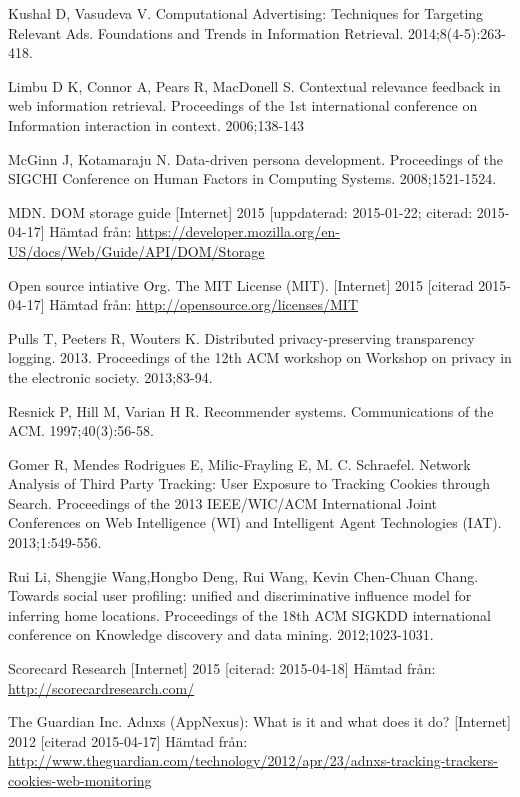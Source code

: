 \documentclass[a4paper,11pt]{article}
\begin{document}
{\begin{thebibliography}{888}
Kushal D, Vasudeva V. Computational Advertising: Techniques for Targeting Relevant Ads. Foundations and Trends in Information Retrieval. 2014;8(4-5):263-418.

Limbu D K, Connor A, Pears R, MacDonell S. Contextual relevance feedback in web information retrieval. Proceedings of the 1st international conference on Information interaction in context. 2006;138-143

McGinn J, Kotamaraju N. Data-driven persona development. Proceedings of the SIGCHI Conference on Human Factors in Computing Systems. 2008;1521-1524.

MDN. DOM storage guide [Internet] 2015 [uppdaterad: 2015-01-22; citerad: 2015-04-17] Hämtad från: \url{https://developer.mozilla.org/en-US/docs/Web/Guide/API/DOM/Storage}

Open source intiative Org. The MIT License (MIT). [Internet] 2015 [citerad 2015-04-17] Hämtad från: \url{http://opensource.org/licenses/MIT}

Pulls T, Peeters R, Wouters K. Distributed privacy-preserving transparency logging. 2013. Proceedings of the 12th ACM workshop on Workshop on privacy in the electronic society. 2013;83-94. 

Resnick P, Hill M, Varian H R. Recommender systems. Communications of the ACM. 1997;40(3):56-58.

Gomer R, Mendes Rodrigues E, Milic-Frayling E, M. C. Schraefel. Network Analysis of Third Party Tracking: User Exposure to Tracking Cookies through Search. Proceedings of the 2013 IEEE/WIC/ACM International Joint Conferences on Web Intelligence (WI) and Intelligent Agent Technologies (IAT). 2013;1:549-556.

Rui Li, Shengjie Wang,Hongbo Deng, Rui Wang, Kevin Chen-Chuan Chang. Towards social user profiling: unified and discriminative influence model for inferring home locations. Proceedings of the 18th ACM SIGKDD international conference on Knowledge discovery and data mining. 2012;1023-1031.

 Scorecard Research [Internet] 2015 [citerad: 2015-04-18] Hämtad från: \url{http://scorecardresearch.com/}

The Guardian Inc. Adnxs (AppNexus): What is it and what does it do? [Internet] 2012 [citerad 2015-04-17] Hämtad från: \url{http://www.theguardian.com/technology/2012/apr/23/adnxs-tracking-trackers-cookies-web-monitoring}


\end{thebibliography}}
\end{document}
